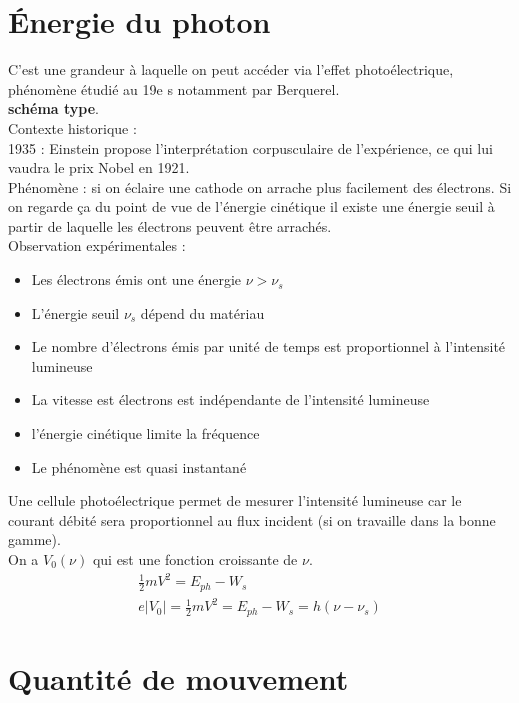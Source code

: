 \documentclass[12pt,prb,aps,epsf]{article}
\begin{document}
\section{Énergie du photon} 
C'est une grandeur à laquelle on peut accéder via l'effet photoélectrique, phénomène étudié au 19e s notamment par Berquerel.\\
\textbf{schéma type}.\\

Contexte historique :\\
1935 : Einstein propose l'interprétation corpusculaire de l'expérience, ce qui lui vaudra le prix Nobel en 1921.\\

Phénomène : si on éclaire une cathode on arrache plus facilement des électrons. Si on regarde ça du point de vue de l'énergie cinétique il existe une énergie seuil à partir de laquelle les électrons peuvent être arrachés.\\

Observation expérimentales :
\begin{itemize}
	\item  Les électrons émis ont une énergie $\nu>\nu_s$
	\item L'énergie seuil $\nu_s$ dépend du matériau
	\item Le nombre d'électrons émis par unité de temps est proportionnel à l'intensité lumineuse
	\item La vitesse est électrons est indépendante de l'intensité lumineuse
	\item l'énergie cinétique limite la fréquence
	\item Le phénomène est quasi instantané
\end{itemize}

Une cellule photoélectrique permet de mesurer l'intensité lumineuse car le courant débité sera proportionnel au flux incident (si on travaille dans la bonne gamme).\\

On a $V_0(\nu)$ qui est une fonction croissante de $\nu$.
\begin{eqnarray}
\frac{1}{2}mV^2 = E_{ph} - W_s\\
e|V_0| = \frac{1}{2}mV^2 = E_{ph} - W_s = h(\nu - \nu_s)
\end{eqnarray}

\section{Quantité de mouvement}
\end{document}
